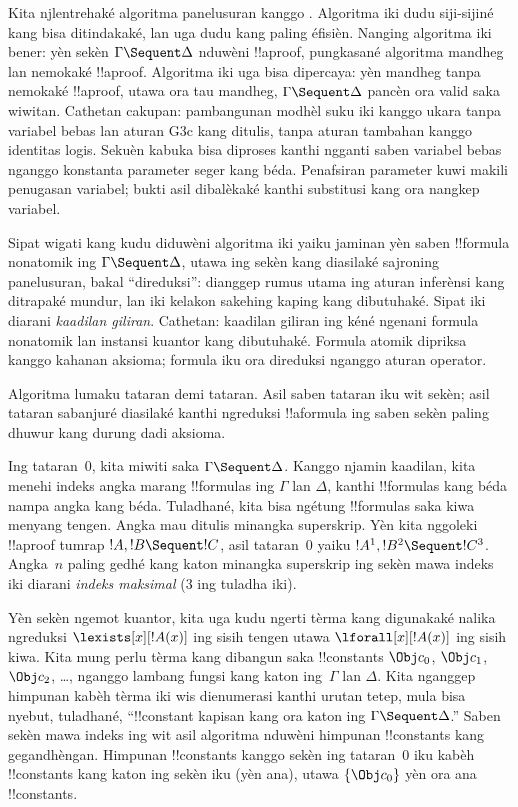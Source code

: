 \documentclass[../../../include/open-logic-section]{subfiles}
\begin{document}


Kita njlentrehaké algoritma panelusuran kanggo
. Algoritma iki dudu siji-sijiné kang bisa ditindakaké,
lan uga dudu kang paling éfisièn. Nanging algoritma iki
bener: yèn sekèn $\Gamma \Sequent \Delta$ nduwèni
!!a{proof}, pungkasané algoritma mandheg lan nemokaké
!!a{proof}. Algoritma iki uga bisa dipercaya: yèn
mandheg tanpa nemokaké !!a{proof}, utawa ora tau
mandheg, $\Gamma \Sequent \Delta$ pancèn ora valid
saka wiwitan.
Cathetan cakupan: pambangunan modhèl suku iki kanggo ukara tanpa variabel bebas lan aturan G3c kang ditulis, tanpa aturan tambahan kanggo identitas logis. Sekuèn kabuka bisa diproses kanthi ngganti saben variabel bebas nganggo konstanta parameter seger kang béda. Penafsiran parameter kuwi makili penugasan variabel; bukti asil dibalèkaké kanthi substitusi kang ora nangkep variabel.

Sipat wigati kang kudu diduwèni algoritma iki yaiku
jaminan yèn saben !!{formula} nonatomik ing
$\Gamma \Sequent \Delta$, utawa ing sekèn kang
diasilaké sajroning panelusuran, bakal ``direduksi'':
dianggep rumus utama ing aturan inferènsi kang
ditrapaké mundur, lan iki kelakon sakehing kaping kang
dibutuhaké. Sipat iki diarani \emph{kaadilan giliran}.
Cathetan: kaadilan giliran ing kéné ngenani formula nonatomik lan instansi kuantor kang dibutuhaké. Formula atomik dipriksa kanggo kahanan aksioma; formula iku ora direduksi nganggo aturan operator.

Algoritma lumaku tataran demi tataran. Asil saben
tataran iku wit sekèn; asil tataran sabanjuré
diasilaké kanthi ngreduksi !!a{formula} ing saben
sekèn paling dhuwur kang durung dadi aksioma.

Ing tataran~$0$, kita miwiti saka
$\Gamma \Sequent \Delta$. Kanggo njamin kaadilan,
kita menehi indeks angka marang !!{formula}s ing
$\Gamma$ lan $\Delta$, kanthi !!{formula}s kang béda
nampa angka kang béda. Tuladhané, kita bisa
ngétung !!{formula}s saka kiwa menyang tengen.
Angka mau ditulis minangka superskrip. Yèn kita
nggoleki !!a{proof} tumrap $!A, !B \Sequent !C$,
asil tataran~$0$ yaiku
$!A^1, !B^2 \Sequent !C^3$. Angka~$n$ paling gedhé
kang katon minangka superskrip ing sekèn mawa indeks
iki diarani \emph{indeks maksimal} ($3$ ing tuladha iki).

Yèn sekèn ngemot kuantor, kita uga kudu ngerti tèrma
kang digunakaké nalika ngreduksi
$\lexists[x][!A(x)]$ ing sisih tengen utawa
$\lforall[x][!A(x)]$ ing sisih kiwa. Kita mung perlu
tèrma kang dibangun saka !!{constant}s $\Obj c_0$,
$\Obj c_1$, $\Obj c_2$, \dots, nganggo lambang fungsi
kang katon ing~$\Gamma$ lan $\Delta$. Kita nganggep
himpunan kabèh tèrma iki wis dienumerasi kanthi urutan
tetep, mula bisa nyebut, tuladhané, ``!!{constant}
kapisan kang ora katon ing $\Gamma \Sequent \Delta$.''
Saben sekèn mawa indeks ing wit asil algoritma
nduwèni himpunan !!{constant}s kang gegandhèngan.
Himpunan !!{constant}s kanggo sekèn ing tataran~$0$
iku kabèh !!{constant}s kang katon ing sekèn iku
(yèn ana), utawa $\{\Obj c_0\}$ yèn ora ana
!!{constant}s.
\end{document}
